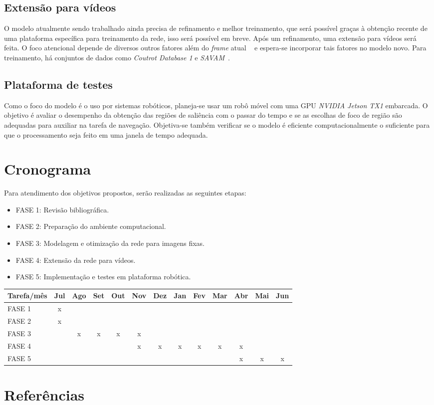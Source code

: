 \documentclass[11pt]{article}
\newcommand{\tit}[1]{\textit{#1}}
\begin{document}
\subsection{Extensão para vídeos}
O modelo atualmente sendo trabalhado ainda precisa de refinamento e melhor
treinamento, que será possível graças à
obtenção recente de uma plataforma específica para treinamento da rede,
isso será possível em breve.
Após um refinamento, uma extensão para vídeos será feita.
O foco atencional depende de diversos outros fatores além do \tit{frame} atual
~\cite{ref:esther-thesis} e espera-se incorporar tais fatores no modelo novo.
Para treinamento, há conjuntos de dados como
\tit{Coutrot Database 1} e
\tit{SAVAM}~\cite{ref:videos}.

\subsection{Plataforma de testes}
Como o foco do modelo é o uso por sistemas robóticos, planeja-se usar
um robô móvel com uma GPU \tit{NVIDIA Jetson TX1} embarcada.
O objetivo é avaliar o desempenho da obtenção das regiões de saliência
com o passar do tempo e se as escolhas de foco de região são adequadas
para auxiliar na tarefa de navegação.
Objetiva-se também verificar se o modelo é eficiente computacionalmente
o suficiente para que o processamento seja feito em uma janela de tempo
adequada.

\section{Cronograma}
Para atendimento dos objetivos propostos, serão realizadas as seguintes etapas:
\begin{itemize}
	\item FASE 1: Revisão bibliográfica.
	\item FASE 2: Preparação do ambiente computacional.
	\item FASE 3: Modelagem e otimização da rede para imagens fixas.
	\item FASE 4: Extensão da rede para vídeos.
	\item FASE 5: Implementação  e testes em plataforma robótica.
\end{itemize}

\begin{table}[H]
\centering
\setlength{\tabcolsep}{.16667em}
\begin{tabular}{|C{3cm}|c|c|c|c|c|c|c|c|c|c|c|c|}
	\hline
	Tarefa/mês & Jul & Ago & Set & Out & Nov & Dez & Jan & Fev & Mar & Abr
		& Mai & Jun \\
	\hline
	FASE 1 & x & & & & & & & & & & &\\
	\hline
	FASE 2 & x & & & & & & & & & & & \\
	\hline
	FASE 3 & & x & x & x & x & & & & & & &  \\
	\hline
	FASE 4 & & & & & x & x & x & x & x & x & &  \\
	\hline
	FASE 5 & & & & & & & & & & x & x & x \\
	\hline
\end{tabular}
\end{table}


\section{Referências}
\printbibliography
\end{document}
